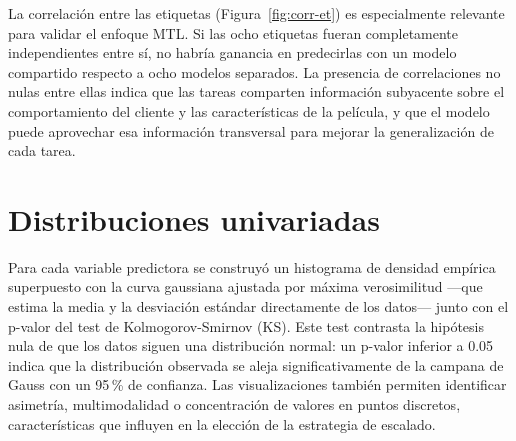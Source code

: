 \documentclass[12pt, a4paper]{report}
\begin{document}
La correlación entre las etiquetas (Figura~\ref{fig:corr-et}) es especialmente relevante para validar el enfoque MTL. Si las ocho etiquetas fueran completamente independientes entre sí, no habría ganancia en predecirlas con un modelo compartido respecto a ocho modelos separados. La presencia de correlaciones no nulas entre ellas indica que las tareas comparten información subyacente sobre el comportamiento del cliente y las características de la película, y que el modelo puede aprovechar esa información transversal para mejorar la generalización de cada tarea.

\section{Distribuciones univariadas}

Para cada variable predictora se construyó un histograma de densidad empírica superpuesto con la curva gaussiana ajustada por máxima verosimilitud ---que estima la media y la desviación estándar directamente de los datos--- junto con el p-valor del test de Kolmogorov-Smirnov (KS). Este test contrasta la hipótesis nula de que los datos siguen una distribución normal: un p-valor inferior a 0.05 indica que la distribución observada se aleja significativamente de la campana de Gauss con un 95\,\% de confianza. Las visualizaciones también permiten identificar asimetría, multimodalidad o concentración de valores en puntos discretos, características que influyen en la elección de la estrategia de escalado.
\end{document}
